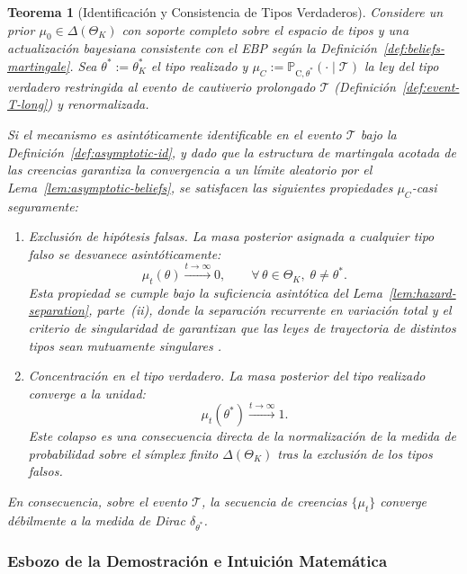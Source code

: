 \documentclass[review,authoryear,12pt]{elsarticle}
\theoremstyle{plain}
\newtheorem{theorem}{Teorema}
\theoremstyle{definition}
\newcommand{\ProbC}[1]{\mathbb{P}_{\mathrm{C},#1}}
\newcommand{\ThetaK}{\Theta_K}
\newcommand{\1}{\mathbf{1}}
\begin{document}
\begin{theorem}[Identificación y Consistencia de Tipos Verdaderos]\label{thm:posterior-consistency}
\normalfont
Considere un prior $\mu_0\in\Delta(\ThetaK)$ con soporte completo sobre el espacio de tipos y una actualización bayesiana consistente con el EBP según la Definición~\ref{def:beliefs-martingale}. Sea $\theta^\ast:=\theta_K^\ast$ el tipo realizado y $\mu_C:=\ProbC{\theta^\ast}(\cdot\mid\mathcal{T})$ la ley del tipo verdadero restringida al evento de cautiverio prolongado $\mathcal{T}$ \textup{(}Definición~\ref{def:event-T-long}\textup{)} y renormalizada.

Si el mecanismo es asintóticamente identificable en el evento $\mathcal{T}$ bajo la Definición~\ref{def:asymptotic-id}, y dado que la estructura de martingala acotada de las creencias garantiza la convergencia a un límite aleatorio por el Lema~\ref{lem:asymptotic-beliefs}, se satisfacen las siguientes propiedades $\mu_C$-casi seguramente:
\begin{enumerate}
  \item Exclusión de hipótesis falsas. La masa posterior asignada a cualquier tipo falso se desvanece asintóticamente:
  \begin{equation*}
  \mu_t(\theta)\xrightarrow{t\to\infty}0,\qquad \forall\,\theta\in\ThetaK,\;\theta\neq\theta^\ast.
  \end{equation*}
  Esta propiedad se cumple bajo la suficiencia asintótica del Lema~\ref{lem:hazard-separation}, parte~\textup{(ii)}, donde la separación recurrente en variación total y el criterio de singularidad de \citet{Kakutani1948} garantizan que las leyes de trayectoria de distintos tipos sean mutuamente singulares \citet{Shiryaev2019Probability}.

  \item Concentración en el tipo verdadero. La masa posterior del tipo realizado converge a la unidad:
  \begin{equation*}
  \mu_t(\theta^\ast)\xrightarrow{t\to\infty}1.
  \end{equation*}
  Este colapso es una consecuencia directa de la normalización de la medida de probabilidad sobre el símplex finito $\Delta(\ThetaK)$ tras la exclusión de los tipos falsos.
\end{enumerate}
En consecuencia, sobre el evento $\mathcal{T}$, la secuencia de creencias $\{\mu_t\}$ converge débilmente a la medida de Dirac $\delta_{\theta^\ast}$.
\end{theorem}

\subsubsection*{Esbozo de la Demostración e Intuición Matemática}
\end{document}
